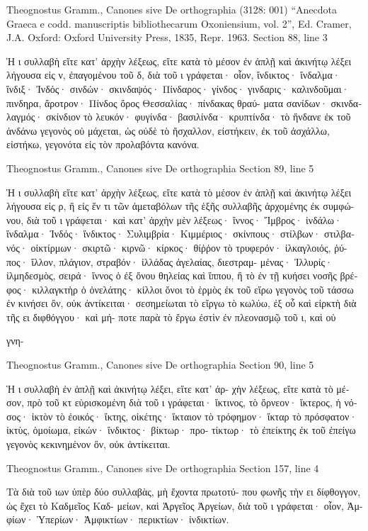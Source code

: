 \documentclass[12pt,letterpaper,twoside,final]{memoir}
\begin{document}
\begin{greek}
Theognostus Gramm., Canones sive De orthographia (3128: 001)
“Anecdota Graeca e codd. manuscriptis bibliothecarum Oxoniensium, vol. 2”, Ed. Cramer, J.A.
Oxford: Oxford University Press, 1835, Repr. 1963.
Section 88, line 3

Ἡ ι συλλαβὴ εἴτε κατ' ἀρχὴν λέξεως, εἴτε κατὰ τὸ 
μέσον ἐν ἁπλῇ καὶ ἀκινήτῳ λέξει λήγουσα εἰς ν, ἐπαγομένου 
τοῦ δ, διὰ τοῦ ι γράφεται· οἷον, ἴνδικτος· ἴνδαλμα· ἴνδιξ· Ἰνδός· 
σινδών· σκινδαψός· Πίνδαρος· γίνδος· γινδαρις· καλινδοῦμαι· 
πινδηρα, ἄροτρον· Πίνδος ὄρος Θεσσαλίας· πίνδακας θραύ-
ματα σανίδων· σκινδαλαγμός· σκίνδιον τὸ λευκόν· φυγίνδα· 
βασιλίνδα· κρυπτίνδα· τὸ ἥνδανε ἐκ τοῦ ἁνδάνω γεγονὸς οὐ 
μάχεται, ὡς οὐδὲ τὸ ἤσχαλλον, εἰστήκειν, ἐκ τοῦ ἀσχάλλω, 
εἰστήκω, γεγονότα εἰς τὸν προλαβόντα κανόνα. 



Theognostus Gramm., Canones sive De orthographia 
Section 89, line 5

Ἡ ι συλλαβὴ εἴτε κατ' ἀρχὴν λέξεως, εἴτε κατὰ τὸ 
μέσον ἐν ἁπλῇ καὶ ἀκινήτῳ λέξει λήγουσα εἰς ρ, ἢ εἰς ἕν τι 
τῶν ἀμεταβόλων τῆς ἑξῆς συλλαβῆς ἀρχομένης ἐκ συμφώ-
νου, διὰ τοῦ ι γράφεται· καὶ κατ' ἀρχὴν μὲν λέξεως· ἴννος· 
Ἴμβρος· ἰνδάλω· ἴνδαλμα· Ἰνδός· ἴνδικτος· Συλιμβρία· 
Κιμμέριος· σκίνπους· στίλβων· στιλβανός· οἰκτίρμων· 
σκιρτῶ· κιρνῶ· κίρκος· θίῤῥον τὸ τρυφερόν· ἰλκαγλοιός, ῥύ-
πος· ἴλλον, πλάγιον, στραβόν· ἰλλάδας ἀγελαίας, διεστραμ-
μένας· Ἰλλυρίς· ἰλμηδεσμὸς, σειρά· ἴννος ὁ ἐξ ὄνου θηλείας 
καὶ ἵππου, ἢ τὸ ἐν τῇ κυήσει νοσῆς βρέφος· κιλλαγκτὴρ ὁ 
ὀνελάτης· κίλλοι ὄνοι τὸ ἑρμὸς ἐκ τοῦ εἵρω γεγονὸς τοῦ 
τάσσω ἐν κινήσει ὂν, οὐκ ἀντίκειται· σεσημείωται τὸ εἴργω 
τὸ κωλύω, ἐξ οὗ καὶ εἰρκτὴ διὰ τῆς ει διφθόγγου· καὶ μή-
ποτε παρὰ τὸ ἔργω ἐστὶν ἐν πλεονασμῷ τοῦ ι, καὶ οὐ

γνη-



Theognostus Gramm., Canones sive De orthographia 
Section 90, line 5

Ἡ ι συλλαβὴ ἐν ἁπλῇ καὶ ἀκινήτῳ λέξει, εἴτε κατ' ἀρ-
χὴν λέξεως, εἴτε κατὰ τὸ μέσον, πρὸ τοῦ κτ εὑρισκομένη διὰ 
τοῦ ι γράφεται· ἴκτινος, τὸ ὄρνεον· ἴκτερος, ἡ νόσος· ἱκτὸν 
τὸ ἐοικός· ἴκτης, οἰκέτης· ἴκταιον τὸ τρόφημον· ἵκταρ τὸ   
πρόσφατον· ἰκτὺς, ὁμοίωμα, εἰκών· ἴνδικτος· βίκτωρ· προ-
τίκτωρ· τὸ ἐπείκτης ἐκ τοῦ ἐπείγω γεγονὸς κεκινημένον ὂν, 
οὐκ ἀντίκειται. 



Theognostus Gramm., Canones sive De orthographia 
Section 157, line 4

Τὰ διὰ τοῦ ιων ὑπὲρ δύο συλλαβὰς, μὴ ἔχοντα πρωτοτύ-
που φωνῆς τὴν ει δίφθογγον, ὡς ἔχει τὸ Καδμεῖος Καδ-
μείων, καὶ Ἀργεῖος Ἀργείων, διὰ τοῦ ι γράφεται· οἷον, Ἀμ-
φίων· Ὑπερίων· Ἀμφικτίων· περικτίων· ἰνδικτίων. 




\end{greek}
\end{document}
